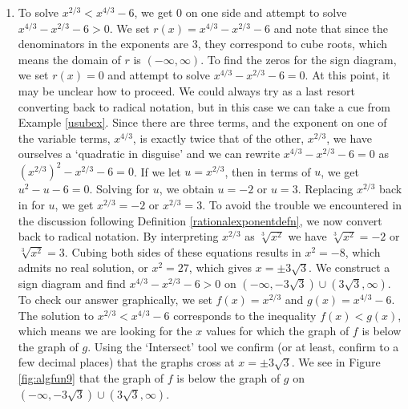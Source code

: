 \medskip

{
\begin{enumerate}

\item  To solve $x^{2/3} < x^{4/3} - 6$, we get $0$ on one side and attempt to solve $x^{4/3} - x^{2/3} - 6 > 0$.  We set $r(x) = x^{4/3} - x^{2/3} - 6$ and note that since the denominators in the exponents are $3$, they correspond to cube roots, which means the domain of $r$ is $(-\infty, \infty)$. To find the zeros for the sign diagram, we set $r(x) = 0$ and attempt to solve $x^{4/3} - x^{2/3} - 6 = 0$.  At this point, it may be unclear how to proceed.  We could always try as a last resort converting back to radical notation,  but in this case we can take a cue from Example \ref{usubex}.  Since there are three terms, and the exponent on one of the variable terms, $x^{4/3}$, is exactly twice that of the other, $x^{2/3}$, we have ourselves a `quadratic in disguise' and we can rewrite  $ x^{4/3} - x^{2/3} - 6 = 0$ as $\left(x^{2/3}\right)^2 - x^{2/3} - 6=0$.  If we let $u = x^{2/3}$, then in terms of $u$, we get $u^2 - u - 6 = 0$.  Solving for $u$, we obtain $u = -2$ or $u = 3$.  Replacing $x^{2/3}$ back in for $u$, we get $x^{2/3} = -2$ or $x^{2/3} = 3$.  To avoid the trouble we encountered in the discussion following Definition \ref{rationalexponentdefn}, we now convert back to radical notation.  By interpreting $x^{2/3}$ as $\sqrt[3]{x^2}$ we have $\sqrt[3]{x^2} = -2$ or $\sqrt[3]{x^2}= 3$.  Cubing both sides of these equations results in $x^2 = -8$, which admits no real solution, or $x^2 = 27$, which gives $x = \pm 3 \sqrt{3}$.  We construct a sign diagram and find $x^{4/3} - x^{2/3} - 6 > 0$ on $\left(-\infty, -3 \sqrt{3}\right)\cup \left(3 \sqrt{3}, \infty\right)$.  To check our answer graphically, we set $f(x) = x^{2/3}$ and $g(x) = x^{4/3}-6$.  The solution to  $x^{2/3} < x^{4/3} - 6$ corresponds to the inequality $f(x) < g(x)$, which means we are looking for the $x$ values for which the graph of $f$ is below the graph of $g$.  Using the `Intersect' tool we confirm (or at least, confirm to a few decimal places) that the graphs cross at $x= \pm 3\sqrt{3}$.  We see in Figure \ref{fig:algfun9} that the graph of $f$  is below the graph of $g$  on $\left(-\infty, -3 \sqrt{3}\right)\cup \left(3 \sqrt{3}, \infty\right)$.


\end{enumerate}}
